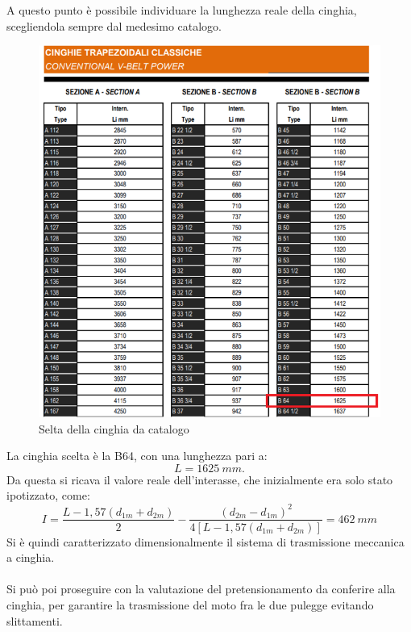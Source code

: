 A questo punto è possibile individuare la lunghezza reale della cinghia, scegliendola sempre dal medesimo catalogo.\\
\newpage
\begin{figure}[h]
    \centering
    \includegraphics[scale=0.65]{Immagini/SceltaCinghia.png}
    \caption{Selta della cinghia da catalogo}
    \label{fig:SceltaCinghia}
\end{figure}

La cinghia scelta è la B64, con una lunghezza pari a: 
\begin{equation}
    L=1625\ mm.
\end{equation}
Da questa si ricava il valore reale dell’interasse, che inizialmente era solo stato ipotizzato, come: 
\begin{equation}
    I=\frac{L-1,57\left(d_{1m}+d_{2m}\right)}{2}-\frac{\left(d_{2m}-d_{1m}\right)^2}{4\left[L-1,57\left(d_{1m}+d_{2m}\right)\right]}=462\ mm
\end{equation}
Si è quindi caratterizzato dimensionalmente il sistema di trasmissione meccanica a cinghia.\\
\\
Si può poi proseguire con la valutazione del pretensionamento da conferire alla cinghia, per garantire la trasmissione del moto fra le due pulegge evitando slittamenti. 
